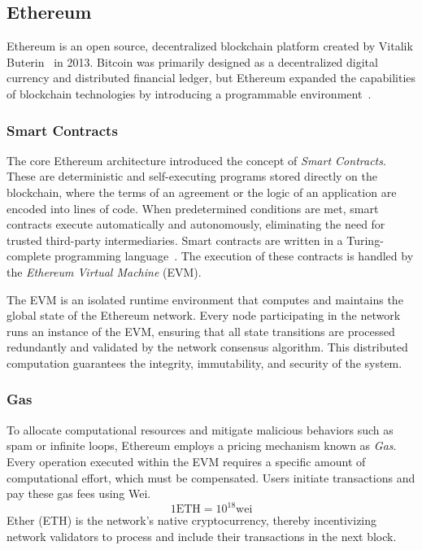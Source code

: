 \subsection{Ethereum}\label{subsec:eth}
Ethereum is an open source, decentralized blockchain platform created by Vitalik Buterin~\cite{ethereum} in 2013.
Bitcoin was primarily designed as a decentralized digital currency and distributed financial ledger,
but Ethereum expanded the capabilities of blockchain technologies by introducing a programmable environment~\cite{ethereum}.

\subsubsection{Smart Contracts}
The core Ethereum architecture introduced the concept of \emph{Smart Contracts}.
These are deterministic and self-executing programs stored directly on the blockchain, where the terms of an agreement or the logic of an application are encoded into lines of code.
When predetermined conditions are met, smart contracts execute automatically and autonomously, eliminating the need for trusted third-party intermediaries.
Smart contracts are written in a Turing-complete programming language~\cite{ethereum}.
The execution of these contracts is handled by the \emph{Ethereum Virtual Machine} (EVM).

The EVM is an isolated runtime environment that computes and maintains the global state of the Ethereum network.
Every node participating in the network runs an instance of the EVM, ensuring that all state transitions are processed redundantly and validated by the network consensus algorithm.
This distributed computation guarantees the integrity, immutability, and security of the system.

\subsubsection{Gas}
To allocate computational resources and mitigate malicious behaviors such as spam or infinite loops, Ethereum employs a pricing mechanism known as \emph{Gas}.
Every operation executed within the EVM requires a specific amount of computational effort, which must be compensated.
Users initiate transactions and pay these gas fees using Wei.
\[
    1 \text{ETH} = 10^{18} \text{wei}
\]
Ether (ETH) is the network's native cryptocurrency, thereby incentivizing network validators to process and include their transactions in the next block.

